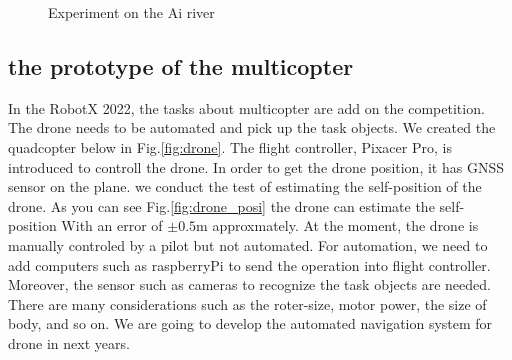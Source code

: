 \documentclass[lettersize,journal]{IEEEtran}
\begin{document}
\begin{figure}[H]
    \begin{center}
    \end{center}
    \caption{Experiment on the Ai river}
    \label{fig:mini_v_experiment}
\end{figure}

\subsection{the prototype of the multicopter}
In the RobotX 2022, the tasks about multicopter are add on the competition. The drone needs to be automated and pick up the task objects.
We created the quadcopter below in Fig.\ref{fig:drone}.
The flight controller, Pixacer Pro\cite{pixracer}, is introduced to controll the drone. 
In order to get the drone position, it has GNSS sensor on the plane.
we conduct the test of estimating the self-position of the drone. As you can see Fig.\ref{fig:drone_posi} the drone can estimate
the self-position With an error of $\pm 0.5 \mathrm{m}$ approxmately.
At the moment, the drone is manually controled by a pilot but not automated.
For automation, we need to add computers such as raspberryPi to send the operation into flight controller. 
Moreover, the sensor such as cameras to recognize the task objects are needed.
There are many considerations such as the roter-size, motor power, the size of body, and so on.
We are going to develop the automated navigation system for drone in next years.
\end{document}
